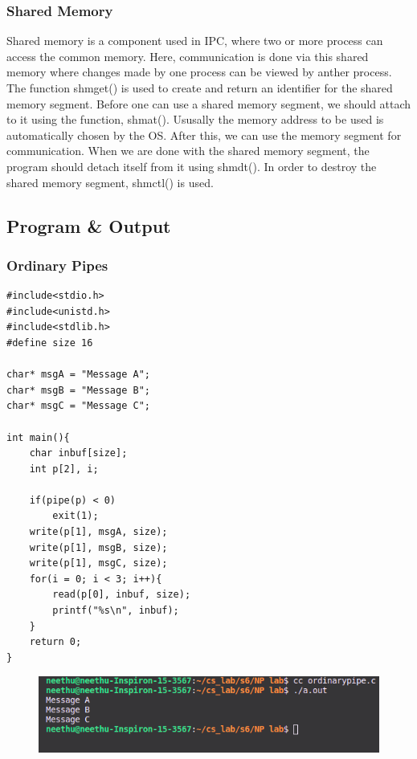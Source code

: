 \subsubsection*{\large Shared Memory}
Shared memory is a component used in IPC, where two or more process can access the common memory. Here, communication is done via this shared memory where changes made by one process can be viewed by anther process. The function shmget()
is used to create and return an identifier for the shared memory segment. Before one can use a shared memory segment, we should attach to it using the function, shmat(). Ususally the memory address to be used is automatically chosen by the
OS. After this, we can use the memory segment for communication. When we are done with the shared memory segment, the program should detach itself from it using shmdt(). In order to destroy the shared memory segment, shmctl() is used.

\subsection{Program \& Output}
\subsubsection{Ordinary Pipes}
\begin{verbatim}
#include<stdio.h>
#include<unistd.h>
#include<stdlib.h>
#define size 16

char* msgA = "Message A";
char* msgB = "Message B";
char* msgC = "Message C";

int main(){
    char inbuf[size];
    int p[2], i;
    
    if(pipe(p) < 0)
        exit(1);
    write(p[1], msgA, size);
    write(p[1], msgB, size);
    write(p[1], msgC, size);
    for(i = 0; i < 3; i++){
        read(p[0], inbuf, size);
        printf("%s\n", inbuf);
    }
    return 0;
}
\end{verbatim}
\begin{figure}[h]
            \centering
            \includegraphics[scale=0.8]{img/e41.png}
\end{figure}
